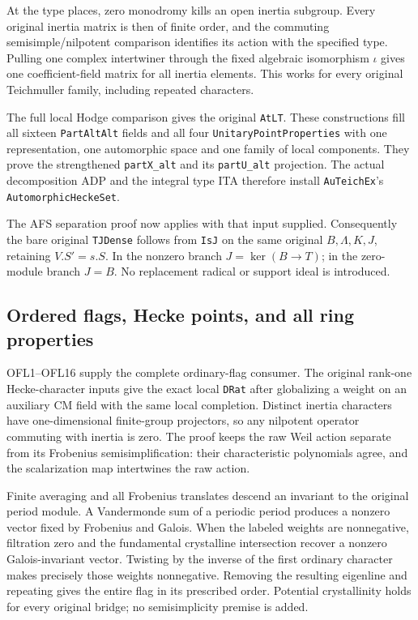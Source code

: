 \documentclass[11pt,a4paper]{article}
\numberwithin{equation}{section}
\theoremstyle{remark}\newtheorem{remark}[theorem]{Remark}
\begin{document}
At the type places, zero monodromy kills an open inertia subgroup.
Every original inertia matrix is then of finite order, and the
commuting semisimple/nilpotent comparison identifies its action
with the specified type.  Pulling one complex intertwiner through
the fixed algebraic isomorphism $\iota$ gives one coefficient-field
matrix for all inertia elements.  This works for every original
Teichmuller family, including repeated characters.

The full local Hodge comparison gives the original
\texttt{At\allowbreak LT}.  These constructions fill all sixteen
\texttt{Part\allowbreak Alt\allowbreak Alt} fields and all four
\texttt{Unitary\allowbreak Point\allowbreak Properties} with one representation, one
automorphic space and one family of local components.
They prove the strengthened \texttt{part\allowbreak X\_\allowbreak alt} and its
\texttt{part\allowbreak U\_\allowbreak alt} projection.  The actual decomposition ADP
and the integral type ITA therefore install
\texttt{Au\allowbreak Teich\allowbreak Ex}'s \texttt{Automorphic\allowbreak Hecke\allowbreak Set}.

The AFS separation proof now applies with that input supplied.
Consequently the bare original \texttt{TJDense} follows from
\texttt{Is\allowbreak J} on the same original $B,\Lambda,K,J$, retaining
$V.S'=s.S$.  In the nonzero branch $J=\ker(B\to T)$;
in the zero-module branch $J=B$.  No replacement radical or
support ideal is introduced.

\subsection{Ordered flags, Hecke points, and all ring properties}

OFL1--OFL16 supply the complete ordinary-flag consumer.
The original rank-one Hecke-character inputs give the exact local
\texttt{DRat} after globalizing a weight on an auxiliary CM field
with the same local completion.  Distinct inertia characters have
one-dimensional finite-group projectors, so any nilpotent operator
commuting with inertia is zero.  The proof keeps the raw Weil
action separate from its Frobenius semisimplification: their
characteristic polynomials agree, and the scalarization map
intertwines the raw action.

Finite averaging and all Frobenius translates descend an invariant
to the original period module.  A Vandermonde sum of a periodic
period produces a nonzero vector fixed by Frobenius and Galois.
When the labeled weights are nonnegative, filtration zero and
the fundamental crystalline intersection recover a nonzero
Galois-invariant vector.  Twisting by the inverse of the first
ordinary character makes precisely those weights nonnegative.
Removing the resulting eigenline and repeating gives the entire
flag in its prescribed order.  Potential crystallinity holds for
every original bridge; no semisimplicity premise is added.
\end{document}
